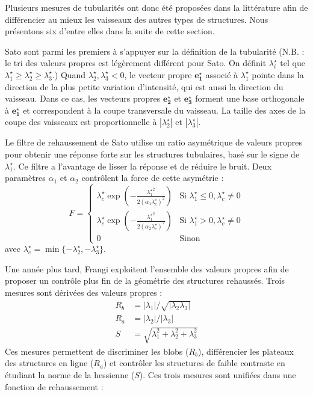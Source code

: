 Plusieurs mesures de tubularités ont donc été proposées dans la littérature afin de différencier au mieux les vaisseaux des autres types de structures. Nous présentons six d'entre elles dans la suite de cette section.


Sato \etal \cite{Sato1998_vesselness} sont parmi les premiers à s'appuyer sur la définition de la tubularité  (N.B. : le tri des valeurs propres est légèrement différent pour Sato. On définit $\lambda^\star_i$ tel que $\lambda^\star_1 \geqslant \lambda^\star_2  \geqslant  \lambda^\star_3$.)
Quand $\lambda^\star_2, \lambda^\star_3 < 0$, le vecteur propre $\mathbf {e^\star_1}$ associé à $\lambda^\star_1$ pointe dans la direction de la plus petite variation d'intensité, qui est aussi la direction du vaisseau.
Dans ce cas, les vecteurs propres $\mathbf {e^\star_2}$ et $\mathbf {e^\star_3}$ forment une base orthogonale à $\mathbf {e^\star_1}$ et correspondent à la coupe transversale du vaisseau.
La taille des axes de la coupe des vaisseaux est proportionnelle à $|\lambda^\star_2|$ et $|\lambda^\star_3|$.

Le filtre de rehaussement de Sato utilise un ratio asymétrique de valeurs propres pour obtenir une réponse forte sur les structures tubulaires, basé sur le signe de $\lambda^\star_1$.
Ce filtre a l'avantage de lisser la réponse et de réduire le bruit. Deux paramètres $\alpha_1$ et $\alpha_2$ contrôlent la force de cette asymétrie :
\begin{equation}
\nonumber
F =
\left\{
\begin{array}{lr}
\lambda^\star_c \exp(-\frac{{\lambda^\star_1}^2}{2(\alpha_1 \lambda^\star_c)^2})  & 
\textrm{Si } \lambda^\star_1 \leqslant 0, \lambda^\star_c \neq 0 \\
\lambda^\star_c \exp(-\frac{{\lambda^\star_1}^2}{2(\alpha_2\lambda^\star_c)^2})  &  
\textrm{Si } \lambda^\star_1 > 0, \lambda^\star_c \neq 0 \\
0 & \textrm{Sinon}
\end{array}
\right.
\end{equation}
avec $\lambda^\star_c = \min\{-\lambda^\star_2,-\lambda^\star_3\}$.


Une année plus tard, Frangi \etal \cite{Frangi1998_vesselness} exploitent l'ensemble des valeurs propres afin de proposer un contrôle plus fin de la géométrie des structures rehaussés. Trois mesures sont dérivées des valeurs propres :
\begin{align}
 \nonumber
  R_b & = |\lambda_1| / \sqrt{|\lambda_2\lambda_3|}\\
R_a & = |\lambda_2| / |\lambda_3| \nonumber\\
S & = \sqrt{\lambda^2_1 + \lambda^2_2 + \lambda^2_3} \nonumber
\end{align}
Ces mesures permettent de discriminer les blobs ($R_b$), différencier les plateaux des structures en ligne ($R_a$) et contrôler les structures de faible contraste en étudiant la norme de la hessienne ($S$). Ces trois mesures sont unifiées dans une fonction de rehaussement :   

